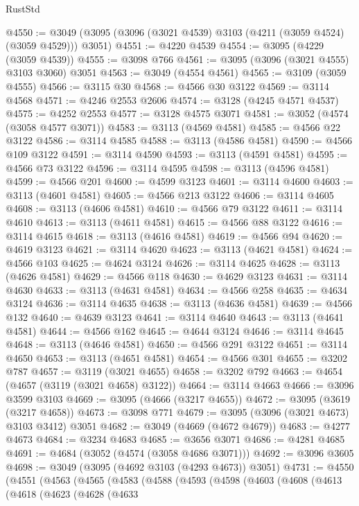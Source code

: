 \begin{lexlean}{RustStd}
\begin{coremodule}
@4550 := @3049 (@3095 (@3096 (@3021 @4539) @3103 (@4211 (@3059 @4524) (@3059 @4529))) @3051)
@4551 := @4220 @4539
@4554 := @3095 (@4229 (@3059 @4539))
@4555 := @3098 @766
@4561 := @3095 (@3096 (@3021 @4555) @3103 @3060) @3051
@4563 := @3049 (@4554 @4561)
@4565 := @3109 (@3059 @4555)
@4566 := @3115 @30
@4568 := @4566 @30 @3122
@4569 := @3114 @4568
@4571 := @4246 @2553 @2606
@4574 := @3128 (@4245 @4571 @4537)
@4575 := @4252 @2553
@4577 := @3128 @4575 @3071
@4581 := @3052 (@4574 (@3058 @4577 @3071))
@4583 := @3113 (@4569 @4581)
@4585 := @4566 @22 @3122
@4586 := @3114 @4585
@4588 := @3113 (@4586 @4581)
@4590 := @4566 @109 @3122
@4591 := @3114 @4590
@4593 := @3113 (@4591 @4581)
@4595 := @4566 @73 @3122
@4596 := @3114 @4595
@4598 := @3113 (@4596 @4581)
@4599 := @4566 @201
@4600 := @4599 @3123
@4601 := @3114 @4600
@4603 := @3113 (@4601 @4581)
@4605 := @4566 @213 @3122
@4606 := @3114 @4605
@4608 := @3113 (@4606 @4581)
@4610 := @4566 @79 @3122
@4611 := @3114 @4610
@4613 := @3113 (@4611 @4581)
@4615 := @4566 @88 @3122
@4616 := @3114 @4615
@4618 := @3113 (@4616 @4581)
@4619 := @4566 @94
@4620 := @4619 @3123
@4621 := @3114 @4620
@4623 := @3113 (@4621 @4581)
@4624 := @4566 @103
@4625 := @4624 @3124
@4626 := @3114 @4625
@4628 := @3113 (@4626 @4581)
@4629 := @4566 @118
@4630 := @4629 @3123
@4631 := @3114 @4630
@4633 := @3113 (@4631 @4581)
@4634 := @4566 @258
@4635 := @4634 @3124
@4636 := @3114 @4635
@4638 := @3113 (@4636 @4581)
@4639 := @4566 @132
@4640 := @4639 @3123
@4641 := @3114 @4640
@4643 := @3113 (@4641 @4581)
@4644 := @4566 @162
@4645 := @4644 @3124
@4646 := @3114 @4645
@4648 := @3113 (@4646 @4581)
@4650 := @4566 @291 @3122
@4651 := @3114 @4650
@4653 := @3113 (@4651 @4581)
@4654 := @4566 @301
@4655 := @3202 @787
@4657 := @3119 (@3021 @4655)
@4658 := @3202 @792
@4663 := @4654 (@4657 (@3119 (@3021 @4658) @3122))
@4664 := @3114 @4663
@4666 := @3096 @3599 @3103
@4669 := @3095 (@4666 (@3217 @4655))
@4672 := @3095 (@3619 (@3217 @4658))
@4673 := @3098 @771
@4679 := @3095 (@3096 (@3021 @4673) @3103 @3412) @3051
@4682 := @3049 (@4669 (@4672 @4679))
@4683 := @4277 @4673
@4684 := @3234 @4683
@4685 := @3656 @3071
@4686 := @4281 @4685
@4691 := @4684 (@3052 (@4574 (@3058 @4686 @3071)))
@4692 := @3096 @3605
@4698 := @3049 (@3095 (@4692 @3103 (@4293 @4673)) @3051)
@4731 := @4550
    (@4551
      (@4563
        (@4565
          (@4583
            (@4588
              (@4593
                (@4598
                  (@4603
                    (@4608
                      (@4613
                        (@4618
                          (@4623
                            (@4628
                              (@4633

\end{coremodule}
\end{lexlean}
